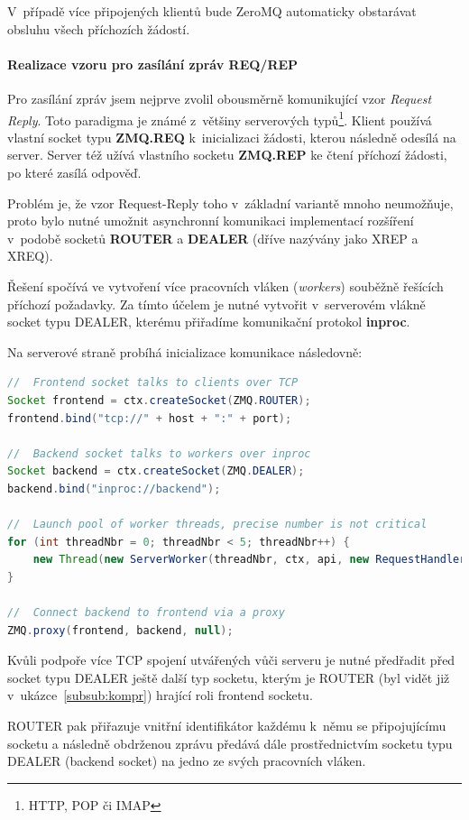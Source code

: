 \documentclass[thesis=M,czech]{FITthesis}[2014/05/07]
\begin{document}
V~případě více připojených klientů bude ZeroMQ automaticky obstarávat obsluhu všech příchozích žádostí. 

\paragraph{Realizace vzoru pro zasílání zpráv REQ/REP}
Pro zasílání zpráv jsem nejprve zvolil obousměrně komunikující vzor \emph{Request Reply}. Toto paradigma je známé z~většiny serverových typů\footnote{HTTP, POP či IMAP}. Klient používá vlastní socket typu \textbf{ZMQ.REQ} k~inicializaci žádosti, kterou následně odesílá na server. Server též užívá vlastního socketu \textbf{ZMQ.REP} ke čtení příchozí žádosti, po které zasílá odpověď. 

Problém je, že vzor Request-Reply toho v~základní variantě mnoho neumožňuje, proto bylo nutné umožnit asynchronní komunikaci implementací rozšíření v~podobě socketů \textbf{ROUTER} a \textbf{DEALER} (dříve nazývány jako XREP a XREQ). 

Řešení spočívá ve vytvoření více pracovních vláken (\emph{workers}) souběžně řešících příchozí požadavky. Za tímto účelem je nutné vytvořit v~serverovém vlákně socket typu DEALER, kterému přiřadíme komunikační protokol \textbf{inproc}.

Na serverové straně probíhá inicializace komunikace následovně: 

\begin{lstlisting}[language=java]
//  Frontend socket talks to clients over TCP
Socket frontend = ctx.createSocket(ZMQ.ROUTER);
frontend.bind("tcp://" + host + ":" + port);

//  Backend socket talks to workers over inproc
Socket backend = ctx.createSocket(ZMQ.DEALER);
backend.bind("inproc://backend");

//  Launch pool of worker threads, precise number is not critical
for (int threadNbr = 0; threadNbr < 5; threadNbr++) {
    new Thread(new ServerWorker(threadNbr, ctx, api, new RequestHandlerJson(), new ResponseHandlerJson())).start();
}

//  Connect backend to frontend via a proxy
ZMQ.proxy(frontend, backend, null);
\end{lstlisting}

Kvůli podpoře více TCP spojení utvářených vůči serveru je nutné předřadit před socket typu DEALER ještě další typ socketu, kterým je ROUTER (byl vidět již v~ukázce~\ref{subsub:kompr}) hrající roli frontend socketu. 

ROUTER pak přiřazuje vnitřní identifikátor každému k~němu se připojujícímu socketu a následně obdrženou zprávu předává dále prostřednictvím socketu typu DEALER (backend socket) na jedno ze svých pracovních vláken.
\end{document}
